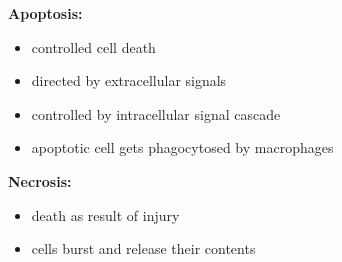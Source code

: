\begin{minipage}{0.48\linewidth}
    \textbf{Apoptosis:}
        \begin{itemize}
            \item controlled cell death
            \item directed by extracellular signals
            \item controlled by intracellular signal cascade
            \item apoptotic cell gets phagocytosed by macrophages
        \end{itemize}
\end{minipage}
\begin{minipage}{0.45\linewidth}

    \textbf{Necrosis:}
        \begin{itemize}
            \item death as result of injury
            \item cells burst and release their contents
        \end{itemize}
        \vspace{16mm}
\end{minipage}